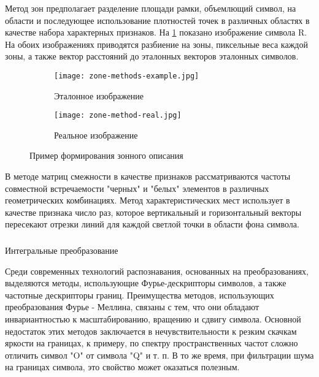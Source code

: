 Метод зон предполагает разделение площади рамки, объемлющий символ, на области и последующее использование плотностей точек в различных областях в качестве набора характерных признаков. На \ref{fig:domain:recognition:statistic_analisys:zones_description} показано изображение символа R. На обоих изображениях приводятся разбиение на зоны, пиксельные веса каждой зоны, а также вектор расстояний до эталонных векторов эталонных символов.

\begin{figure}[ht]
\centering
  \begin{subfigure}[b]{0.4\textwidth} 
    \centering
    \texttt{[image: zone-methods-example.jpg]}  
    \caption{Эталонное изображение}
  \end{subfigure}
  \begin{subfigure}[b]{0.4\textwidth} 
    \centering
    \texttt{[image: zone-method-real.jpg]}  
    \caption{Реальное изображение}
  \end{subfigure}
  \caption{Пример формирования зонного описания}
  \label{fig:domain:recognition:statistic_analisys:zones_description}
\end{figure}

В методе матриц смежности в качестве признаков рассматриваются частоты совместной встречаемости "черных" и "белых" элементов в различных геометрических комбинациях. Метод характеристических мест использует в качестве признака число раз, которое вертикальный и горизонтальный векторы пересекают отрезки линий для каждой светлой точки в области фона символа.


\subsubsection{}
\label{sub:domain:recognition:integral_transformation}
Интегральные преобразование

Среди современных технологий распознавания, основанных на преобразованиях, выделяются методы, использующие Фурье-дескрипторы символов, а также частотные дескрипторы границ.
Преимущества методов, использующих преобразования Фурье - Меллина, связаны с тем, что они обладают инвариантностью к масштабированию, вращению и сдвигу символа. Основной недостаток этих методов заключается в нечувствительности к резким скачкам яркости на границах, к примеру, по спектру пространственных частот сложно отличить символ "O" от символа "Q" и т. п. В то же время, при фильтрации шума на границах символа, это свойство может оказаться полезным.

